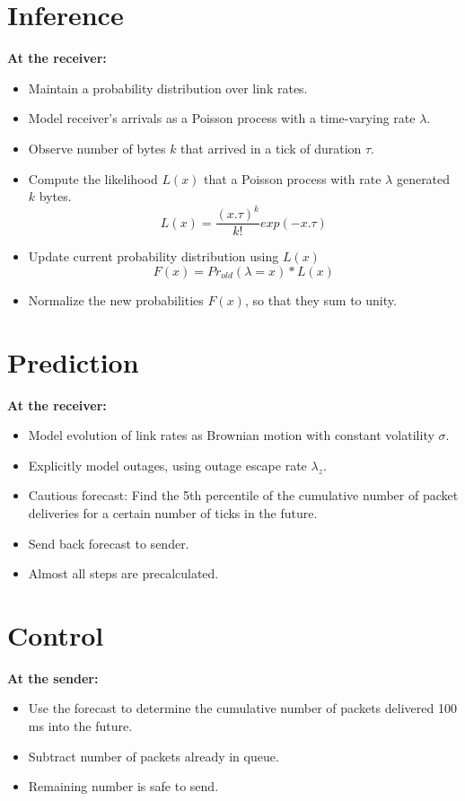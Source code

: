 \begin{multicols}{2}
\section*{Inference}
\begin{center}
\def\svgwidth{0.75 \columnwidth}{\large }
\end{center}
{\large \bf
At the receiver:
\begin{itemize}
\item Maintain a probability distribution over link rates.
\item Model receiver's arrivals as a Poisson process with a time-varying rate $\lambda$.
\item Observe number of bytes $k$ that arrived in a tick of duration $\tau$.
\item Compute the likelihood $L(x)$ that a Poisson process with rate $\lambda$ generated $k$ bytes.
      \begin{equation}
       L(x) = \frac{(x.\tau)^{k}}{k!}exp(-x.\tau)
      \end{equation}
\item Update current probability distribution using $L(x)$
      \begin{equation}
       F(x) = Pr_{old}(\lambda = x)*L(x)
      \end{equation}
\item Normalize the new probabilities $F(x)$, so that they sum to unity.
\end{itemize}
}
\vspace{0.1in}
\section*{Prediction}
{\large \bf
At the receiver:
\begin{itemize}
\item Model evolution of link rates as Brownian motion with constant volatility $\sigma$.
\item Explicitly model outages, using outage escape rate $\lambda_{z}$.
\item Cautious forecast: Find the 5th percentile of the cumulative number of packet deliveries for a certain number of ticks in the future.
\item Send back forecast to sender.
\item Almost all steps are precalculated.
\end{itemize}
}


\section*{Control}
{\large \bf
At the sender:
\begin{itemize}
\item Use the forecast to determine the cumulative number of packets delivered 100 ms into the future.
\item Subtract number of packets already in queue.
\item Remaining number is safe to send.
\end{itemize}
}


\end{multicols}
